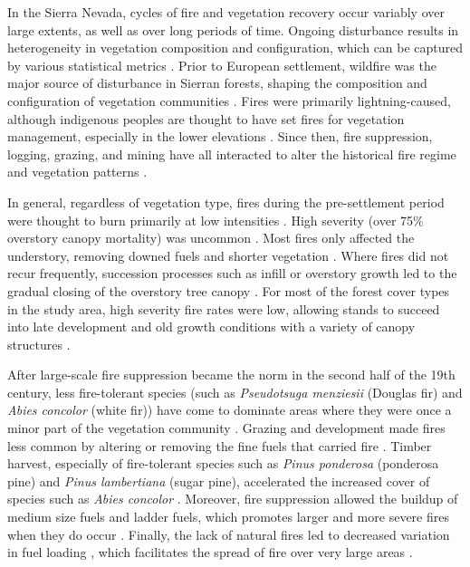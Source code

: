 In the Sierra Nevada, cycles of fire and vegetation recovery occur variably over large extents, as well as over long periods of time. Ongoing disturbance results in heterogeneity in vegetation composition and configuration, which can be captured by various statistical metrics \citep{Monica2008}. Prior to European settlement, wildfire was the major source of disturbance in Sierran forests, shaping the composition and configuration of vegetation communities \citep{SNEP1996a}. Fires were primarily lightning-caused, although indigenous peoples are thought to have set fires for vegetation management, especially in the lower elevations \citep{Anderson1996}. Since then, fire suppression, logging, grazing, and mining have all interacted to alter the historical fire regime and vegetation patterns \citep{Stephens2015,Knapp2013}. 

In general, regardless of vegetation type, fires during the pre-settlement period were thought to burn primarily at low intensities \citep{Skinner1996}. High severity (over 75\% overstory canopy mortality) was uncommon \citep{Mallek2013,Stephens2015}. Most fires only affected the understory, removing downed fuels and shorter vegetation \citep{Stephens2015}. Where fires did not recur frequently, succession processes such as infill or overstory growth led to the gradual closing of the overstory tree canopy \citep{SNEP1996a}. For most of the forest cover types in the study area, high severity fire rates were low, allowing stands to succeed into late development and old growth conditions with a variety of canopy structures \citep{Mallek2013,Safford2014}.

After large-scale fire suppression became the norm in the second half of the 19th century, less fire-tolerant species (such as \emph{Pseudotsuga menziesii} (Douglas fir) and \emph{Abies concolor} (white fir)) have come to dominate areas where they were once a minor part of the vegetation community \citep{Stephens2015}. Grazing and development made fires less common by altering or removing the fine fuels that carried fire \citep{Hessburg2005}. Timber harvest, especially of fire-tolerant species such as \emph{Pinus ponderosa} (ponderosa pine) and \emph{Pinus lambertiana} (sugar pine), accelerated the increased cover of species such as \emph{Abies concolor} \citep{Collins2011}. Moreover, fire suppression allowed the buildup of medium size fuels and ladder fuels, which promotes larger and more severe fires when they do occur \citep{Mallek2013}. Finally, the lack of natural fires led to decreased variation in fuel loading , which facilitates the spread of fire over very large areas \citep{Beaty2007,Meyer2008}.

